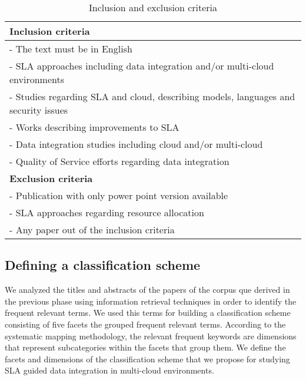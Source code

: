 \begin{table}[!htb]
\begin{center}
\begin{tabular}{p{10cm}}
\bottomrule \hline
\textbf{Inclusion criteria} \\ 
\hline 
- The text must be in English \\ 
- SLA approaches including data integration and/or multi-cloud environments\\
- Studies regarding SLA and cloud, describing models, languages and security issues \\
- Works describing improvements to SLA \\
- Data integration studies including cloud and/or multi-cloud  \\
- Quality of Service efforts regarding data integration \\
\bottomrule \hline 
\textbf{Exclusion criteria} \\ 
\hline 
- Publication with only power point version available \\ 
- SLA approaches regarding resource allocation \\
- Any paper out of the inclusion criteria  \\
\bottomrule \hline
\end{tabular} 
\end{center}
\caption{Inclusion and exclusion criteria}\label{table:criteria}
\end{table}

\subsection{Defining a classification scheme}

We analyzed the titles and abstracts of the papers of the corpus que derived in the previous phase using information retrieval techniques in order to identify the frequent relevant terms. We used this terms for building a classification scheme consisting of five facets the grouped frequent relevant terms. According to the systematic mapping methodology, the relevant frequent keywords are dimensions that represent subcategories within the facets that group them. We define the facets and dimensions of the classification scheme that we propose for studying SLA guided data integration in multi-cloud environments.

